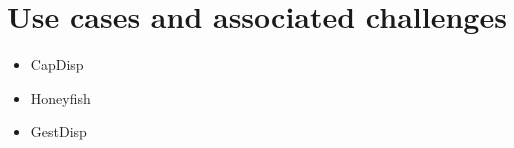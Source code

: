 \section{Use cases and associated challenges}
\begin{itemize}
\item CapDisp
\item Honeyfish
\item GestDisp
\end{itemize}